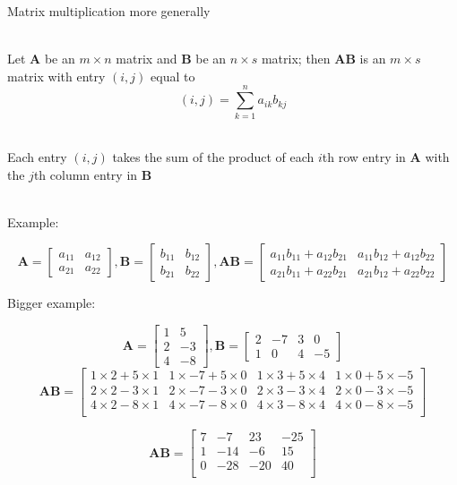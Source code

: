 \documentclass[10pt]{seminar}
\begin{document}
\begin{slide}
\newslide

Matrix multiplication more generally

\ \\Let $\mathbf{A}$ be an $m\times n$ matrix and $\mathbf{B}$ be an $n\times s$ matrix; then $\mathbf{A}\mathbf{B}$ is an $m\times s$ matrix with entry $(i, j)$ equal to $$(i, j)=\sum_{k=1}^n a_{ik}b_{kj}$$


\ \\Each entry $(i, j)$ takes the sum of the product of each $i$th row entry in $\mathbf{A}$ with the $j$th column entry in $\mathbf{B}$

\ \\Example:

$$\mathbf{A}=\begin{bmatrix}
a_{11}& a_{12}\\
a_{21} & a_{22}
\end{bmatrix}, 
\mathbf{B}=\begin{bmatrix}
b_{11}& b_{12}\\
b_{21} & b_{22}
\end{bmatrix},
\mathbf{AB}=\begin{bmatrix}
a_{11}b_{11}+a_{12}b_{21}&a_{11}b_{12}+a_{12}b_{22}\\
a_{21}b_{11}+a_{22}b_{21}& a_{21}b_{12}+a_{22}b_{22}
\end{bmatrix} $$

\newslide

Bigger example:

$$
\mathbf{A}=\begin{bmatrix}
1& 5\\
2 & -3\\
4 & -8
\end{bmatrix}, 
\mathbf{B}=\begin{bmatrix}
2& -7 & 3& 0\\
1 & 0& 4& -5
\end{bmatrix}
$$
$$
\mathbf{AB}=\begin{bmatrix}
1 \times 2+5\times 1& 1\times -7+5\times 0 & 1\times 3+5\times 4 & 1\times 0+5\times -5\\
 2\times 2-3\times 1& 2\times -7-3\times 0& 2\times 3-3\times 4& 2\times 0-3\times -5\\
 4\times 2-8\times 1& 4\times -7-8\times 0& 4\times 3-8\times 4& 4\times 0-8\times -5\\
\end{bmatrix}
$$

$$
\mathbf{AB}=\begin{bmatrix}
7& -7& 23& -25\\
1& -14& -6&15\\
0&-28&-20& 40\\
\end{bmatrix}
$$


\end{slide}
\end{document}
